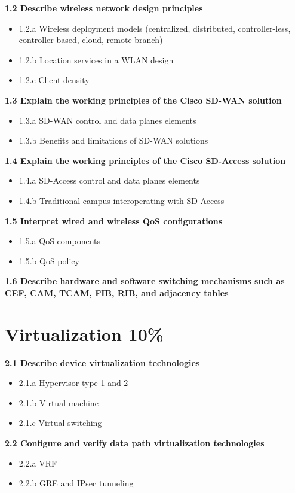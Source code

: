 \documentclass{article}
\begin{document}
\noindent\textbf{1.2 Describe wireless network design principles}
\begin{itemize}
\item 1.2.a Wireless deployment models (centralized, distributed, controller-less, controller-based, cloud, remote branch)
\item 1.2.b Location services in a WLAN design
\item 1.2.c Client density
\end{itemize}

\noindent\textbf{1.3 Explain the working principles of the Cisco SD-WAN solution}
\begin{itemize}
\item 1.3.a SD-WAN control and data planes elements
\item 1.3.b Benefits and limitations of SD-WAN solutions
\end{itemize}

\noindent\textbf{1.4 Explain the working principles of the Cisco SD-Access solution}
\begin{itemize}
\item 1.4.a SD-Access control and data planes elements
\item 1.4.b Traditional campus interoperating with SD-Access
\end{itemize}

\noindent\textbf{1.5 Interpret wired and wireless QoS configurations}
\begin{itemize}
\item 1.5.a QoS components
\item 1.5.b QoS policy
\end{itemize}

\noindent\textbf{1.6 Describe hardware and software switching mechanisms such as CEF, CAM, TCAM, FIB, RIB, and adjacency tables}\\

\newpage
\section{Virtualization 10\%}
\textbf{2.1 Describe device virtualization technologies}
\begin{itemize}
\item 2.1.a Hypervisor type 1 and 2
\item 2.1.b Virtual machine
\item 2.1.c Virtual switching
\end{itemize}

\noindent\textbf{2.2 Configure and verify data path virtualization technologies}
\begin{itemize}
\item 2.2.a VRF
\item 2.2.b GRE and IPsec tunneling
\end{itemize}
\end{document}

